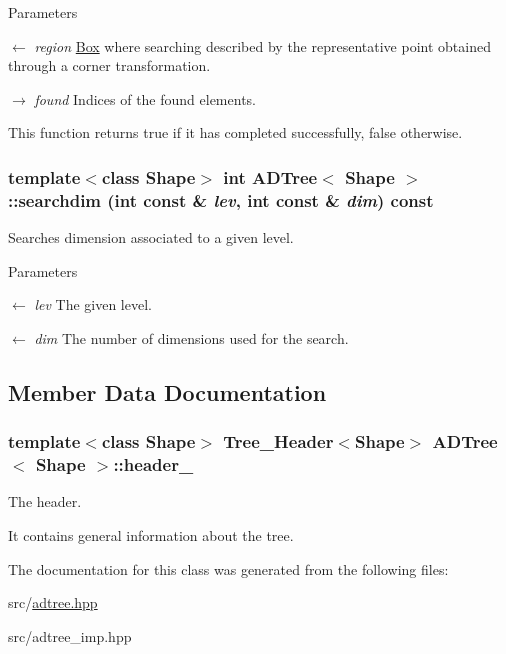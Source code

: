 \begin{DoxyParams}{Parameters}
\item[\mbox{$\leftarrow$} {\em region}]\hyperlink{classBox}{Box} where searching described by the representative point obtained through a corner transformation. \item[\mbox{$\rightarrow$} {\em found}]Indices of the found elements.\end{DoxyParams}
This function returns true if it has completed successfully, false otherwise. \hypertarget{classADTree_a5f5dcde8e682a04c4e8c8c0e6defc595}{
\subsubsection[{searchdim}]{\setlength{\rightskip}{0pt plus 5cm}template$<$class Shape$>$ int {\bf ADTree}$<$ Shape $>$::searchdim (int const \& {\em lev}, \/  int const \& {\em dim}) const}}
\label{classADTree_a5f5dcde8e682a04c4e8c8c0e6defc595}
Searches dimension associated to a given level.


\begin{DoxyParams}{Parameters}
\item[\mbox{$\leftarrow$} {\em lev}]The given level. \item[\mbox{$\leftarrow$} {\em dim}]The number of dimensions used for the search. \end{DoxyParams}


\subsection{Member Data Documentation}
\hypertarget{classADTree_ab5ed42c46d811ca39c9a6966b974a04b}{
\subsubsection[{header\_\-}]{\setlength{\rightskip}{0pt plus 5cm}template$<$class Shape$>$ {\bf Tree\_\-Header}$<$Shape$>$ {\bf ADTree}$<$ Shape $>$::{\bf header\_\-}}}
\label{classADTree_ab5ed42c46d811ca39c9a6966b974a04b}
The header.

It contains general information about the tree. 

The documentation for this class was generated from the following files:\begin{DoxyCompactItemize}
\item 
src/\hyperlink{adtree_8hpp}{adtree.hpp}\item 
src/adtree\_\-imp.hpp\end{DoxyCompactItemize}
